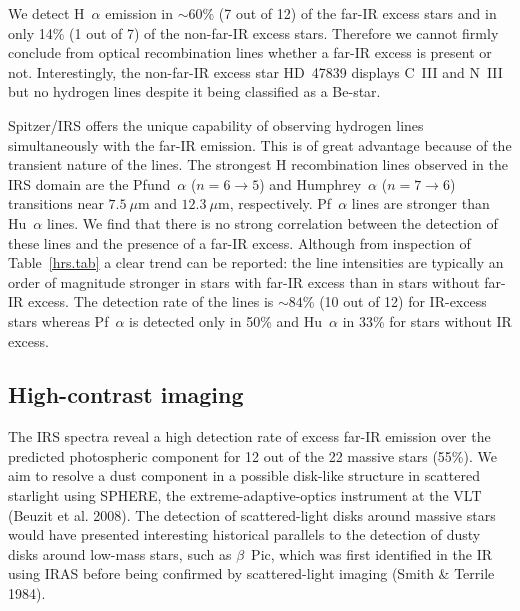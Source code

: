 \documentclass[tradiabstract]{aa} %
\begin{document}

We detect H~$\alpha$ emission in $\sim 60\%$ (7 out of 12) of the
far-IR excess stars and in only 14\% (1 out of 7) of the { non-}far-IR
excess stars. Therefore we cannot firmly conclude from optical {
  recombination} lines whether a far-IR excess is present or not.
Interestingly, the  { non-}far-IR excess star HD~47839 displays C~III
and N~III but no hydrogen lines despite it being classified as a
Be-star.


Spitzer/IRS offers the unique capability of observing hydrogen lines
simultaneously with the far-IR emission.  This is of great advantage
because of the transient nature of the lines. { The strongest H
  recombination lines observed in the IRS domain} are the
Pfund~$\alpha$ ($n=6 \rightarrow 5$) and Humphrey~$\alpha$ ($n=7
\rightarrow 6$) transitions near $7.5\ \mu$m and $12.3 \ \mu$m,
respectively. { Pf~$\alpha$ lines are stronger than Hu~$\alpha$
  lines}. We find that there is { no strong correlation} between
the detection of these lines and the presence of a far-IR
excess. Although from inspection of Table~\ref{hrs.tab} a clear trend
can be reported: the line intensities are typically an order of
magnitude stronger in{ stars with far-IR excess than in stars
  without far-IR excess.} The detection rate of the lines is $\sim
84$\% (10 out of 12) for IR-excess stars whereas Pf~$\alpha$ is
detected only in 50\% and Hu~$\alpha$ in 33\% for stars without IR
excess.




\subsection{High-contrast imaging}


The IRS spectra reveal a high detection rate of excess far-IR emission
over the predicted photospheric component for 12 out of the 22 massive
stars (55\%). We aim to resolve a dust component in a possible
disk-like structure in scattered starlight using SPHERE, the
extreme-adaptive-optics instrument at the VLT (Beuzit et
al. 2008). The detection of scattered-light disks around massive stars
would have presented interesting historical parallels to the detection
of dusty disks around low-mass stars, such as $\beta$~Pic, which was
first identified in the IR using IRAS before being confirmed by
scattered-light imaging (Smith \& Terrile 1984).
\end{document}
